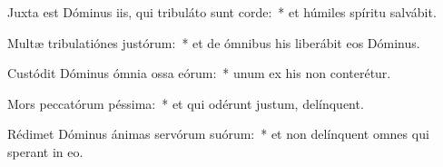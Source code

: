 \item Juxta est Dóminus iis, qui tribuláto sunt corde:~* et húmiles spíritu salvábit.

\item Multæ tribulatiónes justórum:~* et de ómnibus his liberábit eos Dóminus.

\item Custódit Dóminus ómnia ossa eórum:~* unum ex his non conterétur.

\item Mors peccatórum péssima:~* et qui odérunt justum, delínquent.

\item Rédimet Dóminus ánimas servórum suórum:~* et non delínquent omnes qui sperant in eo.

